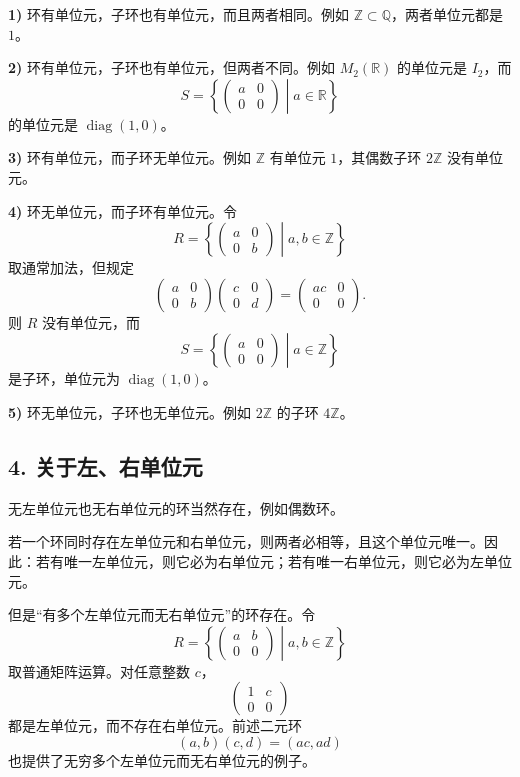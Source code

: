 \textbf{1)} 环有单位元，子环也有单位元，而且两者相同。例如 $\mathbb Z\subset\mathbb Q$，两者单位元都是 $1$。

\textbf{2)} 环有单位元，子环也有单位元，但两者不同。例如 $M_2(\mathbb R)$ 的单位元是 $I_2$，而
\[
S=\left\{\begin{pmatrix}a&0\\0&0\end{pmatrix}\middle|a\in\mathbb R\right\}
\]
的单位元是 $\operatorname{diag}(1,0)$。

\textbf{3)} 环有单位元，而子环无单位元。例如 $\mathbb Z$ 有单位元 $1$，其偶数子环 $2\mathbb Z$ 没有单位元。

\textbf{4)} 环无单位元，而子环有单位元。令
\[
R=\left\{\begin{pmatrix}a&0\\0&b\end{pmatrix}\middle|a,b\in\mathbb Z\right\}
\]
取通常加法，但规定
\[
\begin{pmatrix}a&0\\0&b\end{pmatrix}
\begin{pmatrix}c&0\\0&d\end{pmatrix}
=\begin{pmatrix}ac&0\\0&0\end{pmatrix}.
\]
则 $R$ 没有单位元，而
\[
S=\left\{\begin{pmatrix}a&0\\0&0\end{pmatrix}\middle|a\in\mathbb Z\right\}
\]
是子环，单位元为 $\operatorname{diag}(1,0)$。

\textbf{5)} 环无单位元，子环也无单位元。例如 $2\mathbb Z$ 的子环 $4\mathbb Z$。

\subsection*{4. 关于左、右单位元}

无左单位元也无右单位元的环当然存在，例如偶数环。

若一个环同时存在左单位元和右单位元，则两者必相等，且这个单位元唯一。因此：若有唯一左单位元，则它必为右单位元；若有唯一右单位元，则它必为左单位元。

但是“有多个左单位元而无右单位元”的环存在。令
\[
R=\left\{\begin{pmatrix}a&b\\0&0\end{pmatrix}\middle|a,b\in\mathbb Z\right\}
\]
取普通矩阵运算。对任意整数 $c$，
\[
\begin{pmatrix}1&c\\0&0\end{pmatrix}
\]
都是左单位元，而不存在右单位元。前述二元环
\[
(a,b)(c,d)=(ac,ad)
\]
也提供了无穷多个左单位元而无右单位元的例子。

